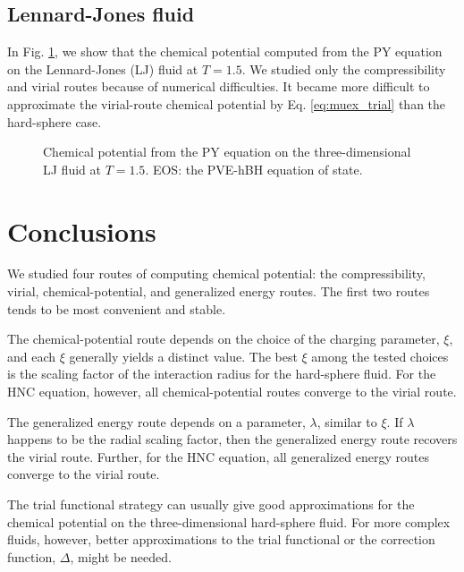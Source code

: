 \documentclass[aip,jcp,reprint,superscriptaddress]{revtex4-1}
\begin{document}
\subsection{Lennard-Jones fluid}




In Fig. \ref{fig:muljpycv},
we show that the chemical potential
computed from the PY equation
on the Lennard-Jones (LJ) fluid
at $T = 1.5$.
%
We studied only the compressibility and virial routes
because of numerical difficulties.
%
It became more difficult
to approximate the virial-route chemical potential
by Eq. \eqref{eq:muex_trial}
than the hard-sphere case.



%
\begin{figure}[h]
  \caption{
    \label{fig:muljpycv}
    Chemical potential from the PY equation
    on the three-dimensional LJ fluid at $T = 1.5$.
    EOS: the PVE-hBH equation of state\cite{kolafa1994}.
  }
\end{figure}





\section{Conclusions}





We studied
four routes of computing
chemical potential:
the compressibility, virial,
chemical-potential,
and generalized energy routes.
%
The first two routes
tends to be most convenient and stable.



The chemical-potential route
depends on the choice of
the charging parameter, $\xi$,
and each $\xi$ generally
yields a distinct value.
%
The best $\xi$ among the tested choices
is the scaling factor
of the interaction radius
for the hard-sphere fluid.
%
For the HNC equation,
however,
all chemical-potential routes
converge to the virial route.



The generalized energy route
depends on a parameter, $\lambda$,
similar to $\xi$.
%
If $\lambda$ happens to be
the radial scaling factor,
then the generalized energy route
recovers the virial route.
%
Further, for the HNC equation,
all generalized energy routes
converge to the virial route.



The trial functional strategy can usually
give good approximations
for the chemical potential
on the three-dimensional hard-sphere fluid.
%
For more complex fluids, however,
better approximations
to the trial functional
or the correction function, $\Delta$,
might be needed.





\end{document}
